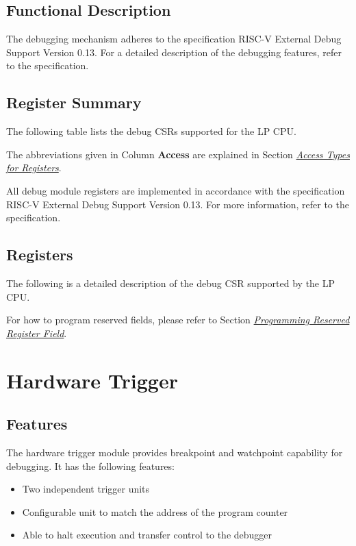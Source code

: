 \documentclass[main\_\_EN.tex]{subfiles}
\begin{document}
\subsection{Functional Description}
The debugging mechanism adheres to the specification RISC-V External Debug Support Version 0.13. For a detailed description of the debugging features, refer to the specification.



\subsection{Register Summary}

The following table lists the debug CSRs supported for the LP CPU.

The abbreviations given in Column \textbf{Access} are explained in Section \hyperref[glossary-access-types]{\textit{Access Types for Registers}}.



All debug module registers are implemented in accordance with the specification RISC-V External Debug Support Version 0.13. For more information, refer to the specification.

\subsection{Registers}
The following is a detailed description of the debug CSR supported by the LP CPU.

For how to program reserved fields, please refer to Section \hyperref[programming-reserved-field]{\textit{Programming Reserved Register Field}}.




\section{Hardware Trigger}\label{sec:ulp-trigger}

\subsection{Features}
The hardware trigger module provides breakpoint and watchpoint capability for debugging. It has the following features:

\begin{itemize}
    \item Two independent trigger units
    \item Configurable unit to match the address of the program counter
    \item Able to halt execution and transfer control to the debugger

\end{itemize}
\end{document}
